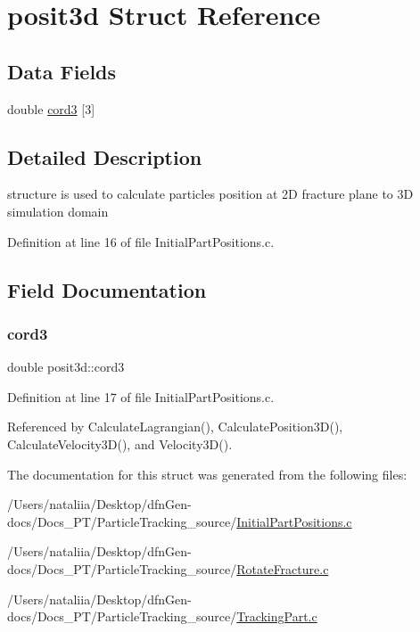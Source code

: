 \hypertarget{structposit3d}{}\section{posit3d Struct Reference}
\label{structposit3d}
\subsection*{Data Fields}
\begin{DoxyCompactItemize}
\item 
double \mbox{\hyperlink{structposit3d_aefc0a716be214a76cae4e2176134c28e}{cord3}} \mbox{[}3\mbox{]}
\end{DoxyCompactItemize}


\subsection{Detailed Description}
structure is used to calculate particle\textquotesingle{}s position at 2D fracture plane to 3D simulation domain 

Definition at line 16 of file Initial\+Part\+Positions.\+c.



\subsection{Field Documentation}
\mbox{\label{structposit3d_aefc0a716be214a76cae4e2176134c28e}} 
\subsubsection{\texorpdfstring{cord3}{cord3}}
{\footnotesize\ttfamily double posit3d\+::cord3}



Definition at line 17 of file Initial\+Part\+Positions.\+c.



Referenced by Calculate\+Lagrangian(), Calculate\+Position3\+D(), Calculate\+Velocity3\+D(), and Velocity3\+D().



The documentation for this struct was generated from the following files\+:\begin{DoxyCompactItemize}
\item 
/\+Users/nataliia/\+Desktop/dfn\+Gen-\/docs/\+Docs\+\_\+\+P\+T/\+Particle\+Tracking\+\_\+source/\mbox{\hyperlink{_initial_part_positions_8c}{Initial\+Part\+Positions.\+c}}\item 
/\+Users/nataliia/\+Desktop/dfn\+Gen-\/docs/\+Docs\+\_\+\+P\+T/\+Particle\+Tracking\+\_\+source/\mbox{\hyperlink{_rotate_fracture_8c}{Rotate\+Fracture.\+c}}\item 
/\+Users/nataliia/\+Desktop/dfn\+Gen-\/docs/\+Docs\+\_\+\+P\+T/\+Particle\+Tracking\+\_\+source/\mbox{\hyperlink{_tracking_part_8c}{Tracking\+Part.\+c}}\end{DoxyCompactItemize}
